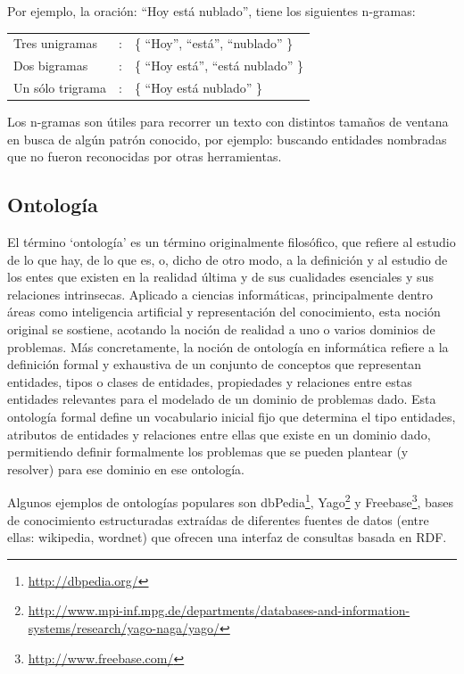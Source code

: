 Por ejemplo, la oración: {\textquotedblleft}Hoy está nublado{\textquotedblright}, tiene los siguientes n-gramas:

\begin{tabular}{lll}
Tres unigramas & : & \{ {\textquotedblleft}Hoy{\textquotedblright}, {\textquotedblleft}está{\textquotedblright}, {\textquotedblleft}nublado{\textquotedblright} \} \\
Dos bigramas & : & \{ {\textquotedblleft}Hoy está{\textquotedblright}, {\textquotedblleft}está nublado{\textquotedblright} \} \\
Un sólo trigrama & : & \{ {\textquotedblleft}Hoy está nublado{\textquotedblright} \}\\
\end{tabular}
\medskip

Los n-gramas son útiles para recorrer un texto con distintos tamaños de ventana en busca de algún patrón conocido, por ejemplo: buscando entidades nombradas que no fueron reconocidas por otras herramientas.

\subsection*{Ontología}
El término `ontología' es un término originalmente filosófico, que refiere al estudio de lo que hay, de lo que es, o, dicho de otro modo, a la definición y al estudio de los entes que existen en la realidad última y de sus cualidades esenciales y sus relaciones intrinsecas. Aplicado a ciencias informáticas, principalmente dentro áreas como inteligencia artificial y representación del conocimiento, esta noción original se sostiene, acotando la noción de realidad a uno o varios dominios de problemas. Más concretamente, la noción de ontología en informática refiere a la definición formal y exhaustiva de un conjunto de conceptos que representan entidades, tipos o clases de entidades, propiedades y relaciones entre estas entidades relevantes para el modelado de un dominio de problemas dado. Esta ontología formal define un vocabulario inicial fijo que determina el tipo entidades, atributos de entidades y relaciones entre ellas que existe en un dominio dado, permitiendo definir formalmente los problemas que se pueden plantear (y resolver) para ese dominio en ese ontología.

Algunos ejemplos de ontologías populares son dbPedia\footnote{\url{http://dbpedia.org/}}, Yago\footnote{\url{http://www.mpi-inf.mpg.de/departments/databases-and-information-systems/research/yago-naga/yago/}} y Freebase\footnote{\url{http://www.freebase.com/}}, bases de conocimiento estructuradas extraídas de diferentes fuentes de datos (entre ellas: wikipedia, wordnet) que ofrecen una interfaz de consultas basada en RDF.


